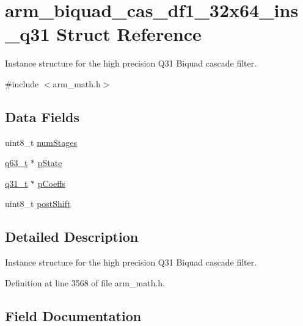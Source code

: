 \hypertarget{structarm__biquad__cas__df1__32x64__ins__q31}{}\section{arm\+\_\+biquad\+\_\+cas\+\_\+df1\+\_\+32x64\+\_\+ins\+\_\+q31 Struct Reference}
\label{structarm__biquad__cas__df1__32x64__ins__q31}


Instance structure for the high precision Q31 Biquad cascade filter.  




{\ttfamily \#include $<$arm\+\_\+math.\+h$>$}

\subsection*{Data Fields}
\begin{DoxyCompactItemize}
\item 
uint8\+\_\+t \hyperlink{structarm__biquad__cas__df1__32x64__ins__q31_a3615af038f56917909e0370c11bc2ec7}{num\+Stages}
\item 
\hyperlink{arm__math_8h_a5aea1cb12fc02d9d44c8abf217eaa5c6}{q63\+\_\+t} $\ast$ \hyperlink{structarm__biquad__cas__df1__32x64__ins__q31_adefeb77301cc04e4d7d22f323029d588}{p\+State}
\item 
\hyperlink{arm__math_8h_adc89a3547f5324b7b3b95adec3806bc0}{q31\+\_\+t} $\ast$ \hyperlink{structarm__biquad__cas__df1__32x64__ins__q31_a68888e36167d81cb7836db10367a1682}{p\+Coeffs}
\item 
uint8\+\_\+t \hyperlink{structarm__biquad__cas__df1__32x64__ins__q31_a74050e9f36542bd56f4052381a82ae8f}{post\+Shift}
\end{DoxyCompactItemize}


\subsection{Detailed Description}
Instance structure for the high precision Q31 Biquad cascade filter. 

Definition at line 3568 of file arm\+\_\+math.\+h.



\subsection{Field Documentation}
